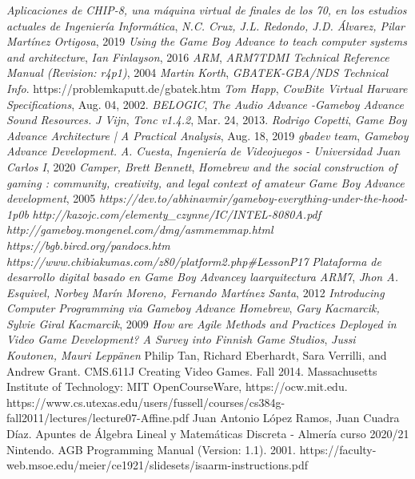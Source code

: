 \fancyhead{}
\fancyfoot{}
\renewcommand{\headrulewidth}{0pt}
\fancyfoot[R]{\thepage}

\begin{thebibliography}{X}
 \textit{Aplicaciones de CHIP-8, una máquina virtual de finales de los 70, en los estudios actuales de Ingeniería Informática},
	\textit{N.C. Cruz, J.L. Redondo, J.D. Álvarez, Pilar Martínez Ortigosa}, 2019
 \textit{Using the Game Boy Advance to teach computer systems and architecture},
	\textit{Ian Finlayson}, 2016
 \textit{ARM}\textsuperscript{\textregistered},
	\textit{ARM7TDMI Technical Reference Manual (Revision: r4p1)}, 2004
 \textit{Martin Korth},
	\textit{GBATEK-GBA/NDS Technical Info}. https://problemkaputt.de/gbatek.htm
 \textit{Tom Happ},
	\textit{CowBite Virtual Harware Specifications}, Aug. 04, 2002.
 \textit{BELOGIC},
	\textit{The Audio Advance -Gameboy Advance Sound Resources.}
 \textit{J Vijn},
	\textit{Tonc v1.4.2}, Mar. 24, 2013.
 \textit{Rodrigo Copetti},
	\textit{Game Boy Advance Architecture | A Practical Analysis}, Aug. 18, 2019
 \textit{gbadev team},
	\textit{Gameboy Advance Development.}
 \textit{A. Cuesta},
	\textit{Ingeniería de Videojuegos - Universidad Juan Carlos I}, 2020
 	\textit{Camper, Brett Bennett}, \textit{Homebrew and the social construction of gaming : community, creativity, and legal context of amateur Game Boy Advance development}, 2005
 \textit{https://dev.to/abhinavmir/gameboy-everything-under-the-hood-1p0b}
 \textit{http://kazojc.com/elementy\_czynne/IC/INTEL-8080A.pdf}
 \textit{http://gameboy.mongenel.com/dmg/asmmemmap.html}
 \textit{https://bgb.bircd.org/pandocs.htm}
 \textit{https://www.chibiakumas.com/z80/platform2.php\#LessonP17}
 \textit{Plataforma de desarrollo digital basado en Game Boy Advancey laarquitectura ARM7},
	\textit{Jhon A. Esquivel, Norbey Marín Moreno, Fernando Martínez Santa}, 2012
 \textit{Introducing Computer Programming via Gameboy Advance Homebrew},
	\textit{Gary Kacmarcik, Sylvie Giral Kacmarcik}, 2009
 \textit{How are Agile Methods and Practices Deployed in Video Game Development? A Survey into Finnish Game Studios},
	\textit{Jussi Koutonen, Mauri Leppänen}
 Philip Tan, Richard Eberhardt, Sara Verrilli, and Andrew Grant. CMS.611J Creating Video Games. Fall 2014. Massachusetts Institute of Technology: MIT OpenCourseWare, https://ocw.mit.edu.
 https://www.cs.utexas.edu/users/fussell/courses/cs384g-fall2011/lectures/lecture07-Affine.pdf
 Juan Antonio López Ramos, Juan Cuadra Díaz. Apuntes de Álgebra Lineal y Matemáticas Discreta - Almería curso 2020/21
 Nintendo\textsuperscript{\textregistered}.
	AGB Programming Manual (Version: 1.1). 2001.
 https://faculty-web.msoe.edu/meier/ce1921/slidesets/isaarm-instructions.pdf
\end{thebibliography}
